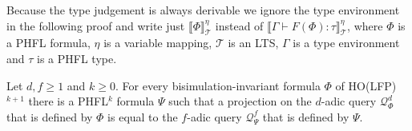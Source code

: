 Because the type judgement is always derivable we ignore the type environment in the following proof and write just $\llbracket \Phi \rrbracket^\eta_\mathcal{T}$ instead of $\llbracket \Gamma \vdash F(\Phi) \colon \tau \rrbracket^\eta_\mathcal{T}$, where $\Phi$ is a PHFL formula, $\eta$ is a variable mapping, $\mathcal{T}$ is an LTS, $\Gamma$ is a type environment and $\tau$ is a PHFL type.

\begin{theorem}
    \label{theorem:ho_lfp_equals_phfl}
    Let $d, f \geq 1$ and $k \geq 0$. For every bisimulation-invariant formula $\Phi$ of HO(LFP)$^{k + 1}$ there is a
    PHFL$^k$ formula $\Psi$ such that a projection on the $d$-adic query $\mathcal{Q}_\Phi^d$ that is defined by $\Phi$ is equal to the $f$-adic query $\mathcal{Q}_\Psi^f$ that is defined by $\Psi$.
\end{theorem}

